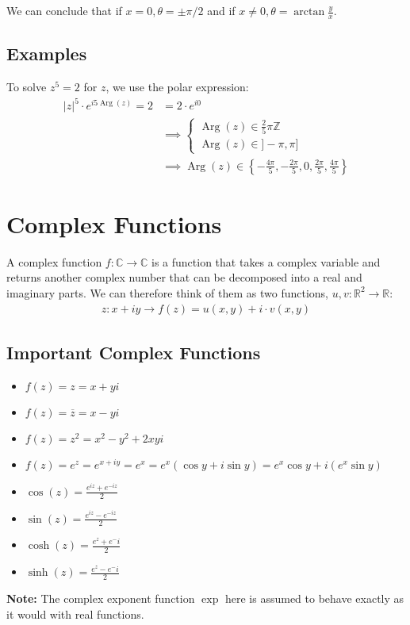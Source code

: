 We can conclude that if $x=0, \theta =\pm\pi/2$ and if $x\ne 0, \theta = \arctan\frac yx$.

\subsection{Examples}
To solve $z^5=2$ for $z$, we use the polar expression:
\begin{equation*}
\begin{split}
|z|^5 \cdot e^{i5\operatorname{Arg}(z)}=2&=2\cdot e^{i0}\\
&\implies
\begin{cases}
    \operatorname{Arg}(z) \in \frac 25\pi \mathbb Z\\
    \operatorname{Arg}(z) \in]-\pi,\pi]
\end{cases}\\
&\implies
\operatorname{Arg}(z)\in\left\{-\frac{4\pi}5,-\frac{2\pi}5 , 0, \frac{2\pi}5, \frac{4\pi}{5}\right\}
\end{split}
\end{equation*}

\section{Complex Functions}
A complex function $f: \mathbb C \to\mathbb C$ is a function that takes a complex variable and returns another complex number that can be decomposed into a real and imaginary parts. We can therefore think of them as two functions, $u, v: \mathbb R^2 \to \mathbb R$:
\begin{equation*}
\begin{split}
z:x+iy\to f(z)=u(x,y)+i\cdot v(x,y)
\end{split}
\end{equation*}

\subsection{Important Complex Functions}
\begin{itemize}
    \item $f(z)=z=x+yi$
    \item $f(z)=\overline z=x-yi$
    \item $f(z)=z^2=x^2-y^2+2xyi$
    \item $f(z)=e^z=e^{x+iy}=e^x=e^x(\cos y+i\sin y)=e^x\cos y + i(e^x\sin y)$
    \item $\cos(z)=\frac{e^{iz}+e^{-iz}}2$
    \item $\sin(z)=\frac{e^{iz}-e^{-iz}}2$
    \item $\cosh(z)=\frac{e^z+e^-i}{2}$
    \item $\sinh(z)=\frac{e^z-e^-i}{2}$
\end{itemize}
\textbf{Note:} The complex exponent function $\exp$ here is assumed to behave exactly as it would with real functions.

